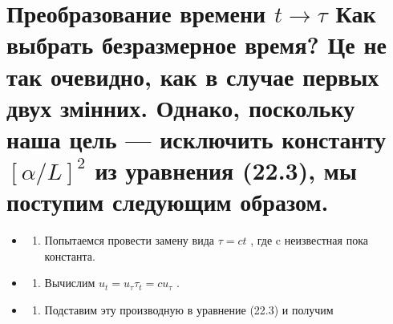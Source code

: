 \documentclass[
  ukrainian,
]{article}
\providecommand{\tightlist}{%
  \setlength{\itemsep}{0pt}\setlength{\parskip}{0pt}}
\begin{document}
\section{\texorpdfstring{Преобразование времени \(t \rightarrow \tau\)
Как выбрать безразмерное время? Це не так очевидно, как в случае первых
двух змінних. Однако, поскольку наша цель --- исключить константу
\([\alpha/L]^2\) из уравнения (22.3), мы поступим следующим
образом.}{Преобразование времени t \textbackslash rightarrow \textbackslash tau Как выбрать безразмерное время? Це не так очевидно, как в случае первых двух змінних. Однако, поскольку наша цель --- исключить константу {[}\textbackslash alpha/L{]}\^{}2 из уравнения (22.3), мы поступим следующим образом.}}\label{ux43fux440ux435ux43eux431ux440ux430ux437ux43eux432ux430ux43dux438ux435-ux432ux440ux435ux43cux435ux43dux438-t-rightarrow-tau-ux43aux430ux43a-ux432ux44bux431ux440ux430ux442ux44c-ux431ux435ux437ux440ux430ux437ux43cux435ux440ux43dux43eux435-ux432ux440ux435ux43cux44f-ux446ux435-ux43dux435-ux442ux430ux43a-ux43eux447ux435ux432ux438ux434ux43dux43e-ux43aux430ux43a-ux432-ux441ux43bux443ux447ux430ux435-ux43fux435ux440ux432ux44bux445-ux434ux432ux443ux445-ux437ux43cux456ux43dux43dux438ux445.-ux43eux434ux43dux430ux43aux43e-ux43fux43eux441ux43aux43eux43bux44cux43aux443-ux43dux430ux448ux430-ux446ux435ux43bux44c-ux438ux441ux43aux43bux44eux447ux438ux442ux44c-ux43aux43eux43dux441ux442ux430ux43dux442ux443-alphal2-ux438ux437-ux443ux440ux430ux432ux43dux435ux43dux438ux44f-22.3-ux43cux44b-ux43fux43eux441ux442ux443ux43fux438ux43c-ux441ux43bux435ux434ux443ux44eux449ux438ux43c-ux43eux431ux440ux430ux437ux43eux43c.}

\begin{itemize}
\tightlist
\item
  \begin{enumerate}
  \def\labelenumi{\arabic{enumi}.}
  \tightlist
  \item
    Попытаемся провести замену вида \(\tau = ct\) , где c неизвестная
    пока константа.
  \end{enumerate}
\item
  \begin{enumerate}
  \def\labelenumi{\arabic{enumi}.}
  \setcounter{enumi}{1}
  \tightlist
  \item
    Вычислим \(u_t = u_{\tau} \tau_t = c u_{\tau}\) .
  \end{enumerate}
\item
  \begin{enumerate}
  \def\labelenumi{\arabic{enumi}.}
  \setcounter{enumi}{2}
  \tightlist
  \item
    Подставим эту производную в уравнение (22.3) и получим
  \end{enumerate}
\end{itemize}
\end{document}

